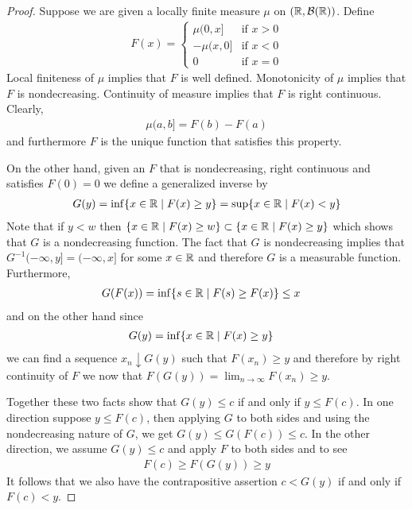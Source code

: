 \documentclass{amsart}
\theoremstyle{remark}
\theoremstyle{definition}
\begin{document}
\begin{proof}
Suppose we are given a locally finite measure $\mu$ on
$(\mathbb{R},\mathcal{B}(\mathbb{R}))$.  Define
\begin{align*}
F(x) = \begin{cases}
\mu (0,x] & \text{if $x > 0$}\\
-\mu (x, 0] & \text{if $x < 0$}\\
0 & \text{if $x=0$}
\end{cases}
\end{align*}
Local finiteness of $\mu$ implies that $F$ is well defined.
Monotonicity of $\mu$ implies that $F$ is nondecreasing.  Continuity
of measure implies that $F$ is right continuous.  Clearly, 
\begin{align*}
\mu (a,b] = F(b) - F(a)
\end{align*} and furthermore $F$ is the unique function that satisfies
this property.

On the other hand, given an $F$ that is nondecreasing, right
continuous and satisfies $F(0) = 0$ we define a generalized inverse by 
\begin{align*}
G(y) = \inf \lbrace x \in \mathbb{R} \mid F(x) \geq y \rbrace = \sup
\lbrace x \in \mathbb{R} \mid F(x) < y \rbrace
\end{align*}
Note that if $y < w$ then $\lbrace x \in \mathbb{R} \mid F(x) \geq w
\rbrace \subset \lbrace x \in \mathbb{R} \mid F(x) \geq y \rbrace$ which
shows that $G$ is a nondecreasing function.  The fact that $G$ is
nondecreasing implies that $G^{-1} (-\infty, y] = (-\infty, x]$ for
some $x \in \mathbb{R}$ and therefore $G$ is a measurable function.  
Furthermore, 
\begin{align*}
G(F(x)) &= \inf\lbrace s \in \mathbb{R} \mid F(s) \geq F(x)
\rbrace \leq x
\end{align*}
and on the other hand since 
\begin{align*}
G(y) &= \inf\lbrace x \in \mathbb{R} \mid F(x) \geq y
\rbrace 
\end{align*}
we can find a sequence $x_n \downarrow G(y)$ such that $F(x_n) \geq y$
and therefore by right continuity of $F$ we now that $F(G(y)) =
\lim_{n\to\infty} F(x_n) \geq y$.

Together these two facts show that 
$G(y) \leq c$ if and only if $y \leq F(c)$.  In one direction suppose
$y \leq F(c)$, then applying $G$ to both sides and using the
nondecreasing nature of $G$, we get $G(y) \leq G(F(c)) \leq c$.  In
the other direction, we assume $G(y) \leq c$ and apply $F$ to both
sides and to see
\begin{align*}
F(c) \geq F(G(y)) \geq y
\end{align*}
It follows that we also have the contrapositive assertion $c < G(y)$ if and only if $F(c) < y$.


\end{proof}
\end{document}
